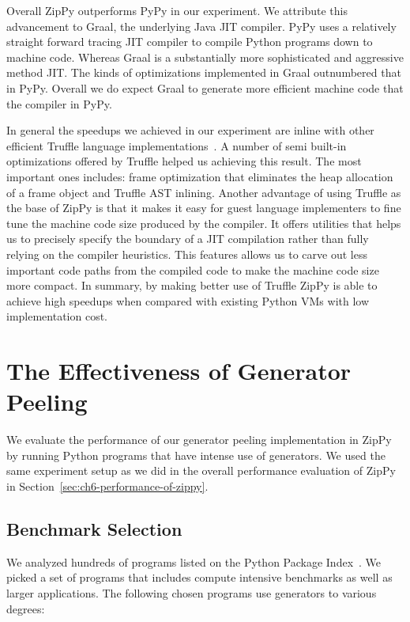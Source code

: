 Overall ZipPy outperforms PyPy in our experiment.
We attribute this advancement to Graal, the underlying Java JIT compiler.
PyPy uses a relatively straight forward tracing JIT compiler to compile Python programs down to machine code.
Whereas Graal is a substantially more sophisticated and aggressive method JIT.
The kinds of optimizations implemented in Graal outnumbered that in PyPy.
Overall we do expect Graal to generate more efficient machine code that the compiler in PyPy.

In general the speedups we achieved in our experiment are inline with other efficient Truffle language implementations~.
A number of semi built-in optimizations offered by Truffle helped us achieving this result.
The most important ones includes: frame optimization that eliminates the heap allocation of a frame object and Truffle AST inlining.
Another advantage of using Truffle as the base of ZipPy is that it makes it easy for guest language implementers to fine tune the machine code size produced by the compiler.
It offers utilities that helps us to precisely specify the boundary of a JIT compilation rather than fully relying on the compiler heuristics.
This features allows us to carve out less important code paths from the compiled code to make the machine code size more compact.
In summary, by making better use of Truffle ZipPy is able to achieve high speedups when compared with existing Python VMs with low implementation cost.

\section{The Effectiveness of Generator Peeling}

We evaluate the performance of our generator peeling implementation in ZipPy by running Python programs that have intense use of generators.
We used the same experiment setup as we did in the overall performance evaluation of ZipPy in Section~\ref{sec:ch6-performance-of-zippy}.

\subsection{Benchmark Selection}

We analyzed hundreds of programs listed on the Python Package Index~\cite{pypi}.
We picked a set of programs that includes compute intensive benchmarks as well as larger applications.
The following chosen programs use generators to various degrees:

